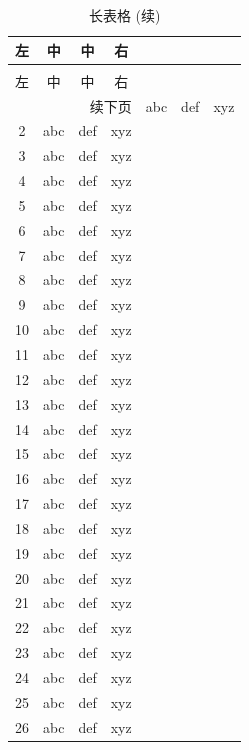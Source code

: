 \begin{center}
  \begin{longtable}{cccc}
    \caption{长表格}\label{tab:longtable}\\ %
    \toprule
    左 & 中 & 中 & 右\\
    \midrule
    \endfirsthead  %
    \caption[]{长表格 (续)}\\ %
    \toprule
    左 & 中 & 中 & 右\\
    \midrule
    \endhead  %
    \hline
    \multicolumn{4}{r}{\small 续下页}
    \endfoot  %
    \bottomrule
    \captionnote{这是个长表格.}
    \endlastfoot  %
    1  &  abc  &  def  &  xyz \\
    2  &  abc  &  def  &  xyz \\
    3  &  abc  &  def  &  xyz \\
    4  &  abc  &  def  &  xyz \\
    5  &  abc  &  def  &  xyz \\
    6  &  abc  &  def  &  xyz \\
    7  &  abc  &  def  &  xyz \\
    8  &  abc  &  def  &  xyz \\
    9  &  abc  &  def  &  xyz \\
    10 &  abc  &  def  &  xyz \\
    11 &  abc  &  def  &  xyz \\
    12 &  abc  &  def  &  xyz \\
    13 &  abc  &  def  &  xyz \\
    14 &  abc  &  def  &  xyz \\
    15 &  abc  &  def  &  xyz \\
    16 &  abc  &  def  &  xyz \\
    17 &  abc  &  def  &  xyz \\
    18 &  abc  &  def  &  xyz \\
    19 &  abc  &  def  &  xyz \\
    20 &  abc  &  def  &  xyz \\
    21 &  abc  &  def  &  xyz \\
    22 &  abc  &  def  &  xyz \\
    23 &  abc  &  def  &  xyz \\
    24 &  abc  &  def  &  xyz \\
    25 &  abc  &  def  &  xyz \\
    26 &  abc  &  def  &  xyz \\

\end{longtable}
\end{center}
